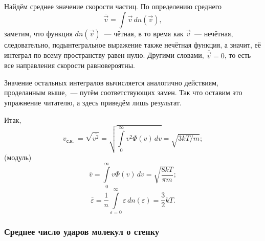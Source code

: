 Найдём среднее значение скорости частиц. По определению среднего
\begin{equation*}
    \overline{\vec{v}} = \int \vec{v} \, dn(\vec{v}),
\end{equation*}
заметим, что функция $dn(\vec{v})$~--- чётная, в то время как $\vec{v}$~--- нечётная, следовательно, подынтегральное выражение также нечётная функция, а значит, её интеграл по всему пространству равен нулю. Другими словами, $\overline{\vec{v}} = 0$, то есть все направления скорости равновероятны.

Значение остальных интегралов вычисляется аналогично действиям, проделанным выше,~--- путём соответствующих замен. Так что оставим это упражнение читателю, а здесь приведём лишь результат. 

Итак,  
\begin{equation}
    v_{\text {с.к. }} 
        = \sqrt{\overline{v^2}}
        = \sqrt{\int\limits_0^\infty v^2 \Phi(v) \, dv} 
        = \sqrt{3 k T / m};
\end{equation}
 (модуль) 
\begin{equation}
     \overline{v}
         = \int\limits_0^{\infty} v \Phi(v) \, dv
         = \sqrt{\frac{8 k T}{\pi m}};
\end{equation}
\begin{equation}
    \bar{\varepsilon} 
        = \frac{1}{n} \int\limits_{\varepsilon = 0}^{\infty} \varepsilon \, d n(\varepsilon) 
        = \frac{3}{2} k T.
\end{equation}

\subsubsection*{Среднее число ударов молекул о стенку}

